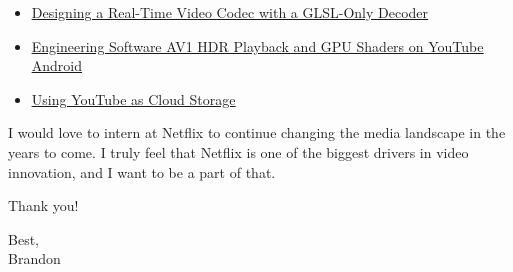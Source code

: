 \documentclass[letterpaper,11pt]{article}
\let\oldhref\href
\renewcommand{\href}[2]{\oldhref{#1}{\uline{#2}}}
\begin{document}
\begin{itemize}[leftmargin=0.15in, itemsep=0pt, topsep=0pt]
    \item \href{https://blog.brandonli.me/designing-a-real-time-video-codec-with-a-glsl-only-decoder/}{Designing a Real-Time Video Codec with a GLSL-Only Decoder}
    \item \href{https://blog.brandonli.me/engineering-software-av1-hdr-playback-and-gpu-shaders-on-youtube-android/}{Engineering Software AV1 HDR Playback and GPU Shaders on YouTube Android}
    \item \href{https://blog.brandonli.me/using-youtube-as-cloud-storage/}{Using YouTube as Cloud Storage}
\end{itemize}

I would love to intern at Netflix to continue changing the media landscape in the years to come. I truly feel that Netflix is one of the biggest drivers in video innovation, and I want to be a part of that.

Thank you! 

Best,\\
Brandon
\end{document}
